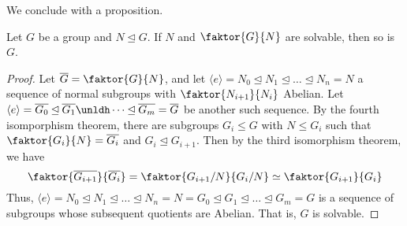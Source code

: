 We conclude with a proposition.

\begin{proposition}\label{proposition_3.5.6}
  Let $G$ be a group and  $N \unlhd G$. If  $N$ and  $\faktor{G}{N}$ are
  solvable, then so is $G$.
\end{proposition}
\begin{proof}
  Let $\bar{G}=\faktor{G}{N}$, and let $\langle e \rangle=N_0 \unlhd N_1
  \unlhd \dots \unlhd N_n=N$ a sequence of normal subgroups with
  $\faktor{N_{i+1}}{N_i}$ Abelian. Let $\langle e \rangle=\bar{G_0} \unlhd
  \bar{G_1} \unldh \dots \unlhd \bar{G_m}=\bar{G}$ be another such sequence.
  By the fourth isomporphism theorem, there are subgroups $G_i \leq G$ with
  $N \leq G_i$ such that $\faktor{G_i}{N}=\bar{G_i}$ and $G_i \unlhd G_{i+1}$.
  Then by the third isomorphism theorem, we have
  \begin{equation*}
    \faktor{\bar{G_{i+1}}}{\bar{G_i}}=\faktor{G_{i+1}/N}{G_i/N} \simeq
    \faktor{G_{i+1}}{G_i}
  \end{equation*}
  Thus, $\langle e \rangle=N_0 \unlhd N_1 \unlhd \dots \unlhd N_n=N=G_0 \unlhd G_1
  \unlhd \dots \unlhd G_m=G$ is a sequence of subgroups whose subsequent
  quotients are Abelian. That is, $G$ is solvable.
\end{proof}
